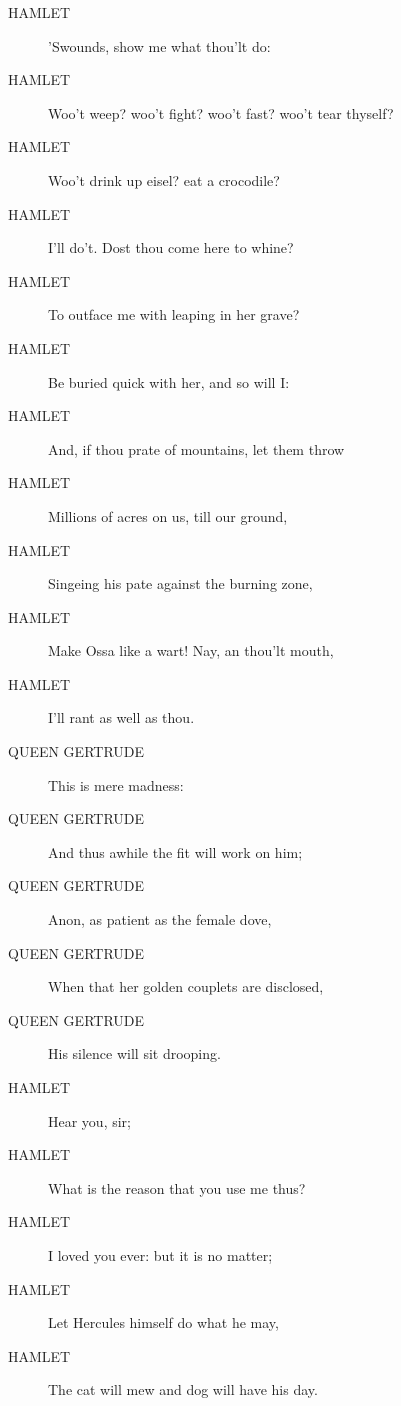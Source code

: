 \documentclass{article}
\begin{document}
\begin{description}
            
\item[HAMLET] 'Swounds, show me what thou'lt do:
\item[HAMLET] Woo't weep? woo't fight? woo't fast? woo't tear thyself?
\item[HAMLET] Woo't drink up eisel? eat a crocodile?
\item[HAMLET] I'll do't. Dost thou come here to whine?
\item[HAMLET] To outface me with leaping in her grave?
\item[HAMLET] Be buried quick with her, and so will I:
\item[HAMLET] And, if thou prate of mountains, let them throw
\item[HAMLET] Millions of acres on us, till our ground,
\item[HAMLET] Singeing his pate against the burning zone,
\item[HAMLET] Make Ossa like a wart! Nay, an thou'lt mouth,
\item[HAMLET] I'll rant as well as thou.
\end{description}
          
\begin{description}
            
\item[QUEEN GERTRUDE] This is mere madness:
\item[QUEEN GERTRUDE] And thus awhile the fit will work on him;
\item[QUEEN GERTRUDE] Anon, as patient as the female dove,
\item[QUEEN GERTRUDE] When that her golden couplets are disclosed,
\item[QUEEN GERTRUDE] His silence will sit drooping.
\end{description}
          
\begin{description}
            
\item[HAMLET] Hear you, sir;
\item[HAMLET] What is the reason that you use me thus?
\item[HAMLET] I loved you ever: but it is no matter;
\item[HAMLET] Let Hercules himself do what he may,
\item[HAMLET] The cat will mew and dog will have his day.
\end{description}
          
\end{document}
